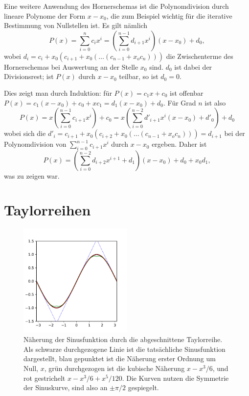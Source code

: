 Eine weitere Anwendung des Hornerschemas ist die Polynomdivision durch
lineare Polynome der Form $x-x_0$, die zum Beispiel wichtig für die
iterative Bestimmung von Nullstellen ist. Es gilt nämlich
\begin{equation}
  \label{eq:polynomdiv}
  P(x) = \sum_{i=0}^{n} c_ix^{i} = 
  \left(\sum_{i=0}^{n-1} d_{i+1}x^{i}\right)(x-x_0) + d_0,
\end{equation}
wobei $d_i = c_i + x_0(c_{i+1} + x_0(\ldots (c_{n-1} + x_o c_n)))$ die
Zwischenterme des Hornerschemas bei Auswertung an der Stelle $x_0$
sind. $d_0$ ist dabei der Divisionsrest; ist $P(x)$ durch $x-x_0$
teilbar, so ist $d_0=0$. 

Dies zeigt man durch Induktion: für $P(x) = c_1 x + c_0$ ist offenbar
$P(x) = c_1(x-x_0) + c_0 + x c_1 = d_1(x-x_0) + d_0$. Für Grad $n$ ist
also
\begin{equation}
    P(x) = x \left(\sum_{i=0}^{n-1} c_{i+1}x^{i}\right) + c_0
    = x\left(\sum_{i=0}^{n-2} d'_{i+1}x^{i}(x-x_0) + d'_0\right) +
    d_0
\end{equation}
wobei sich die $d'_i = c_{i+1} + x_0(c_{i+2} + x_0(\ldots (c_{n-1} +
x_o c_n))) = d_{i+1}$ bei der Polynomdivision von $\sum_{i=0}^{n-1}
c_{i+1}x^{i}$ durch $x-x_0$ ergeben. Daher ist
\begin{equation}
    P(x) = \left(\sum_{i=0}^{n-2} d_{i+2}x^{i+1} + d_1\right)(x-x_0) +
    d_0 + x_0 d_1,
\end{equation}
was zu zeigen war.

\section{Taylorreihen}

\begin{figure}
  \centering
  \includegraphics[width=0.5\textwidth]{plots/sinus}
  \caption{Näherung der Sinusfunktion durch die abgeschnittene
    Taylorreihe. Als schwarze durchgezogene Linie ist die tatsächliche
    Sinusfunktion dargestellt, blau gepunktet ist die Näherung erster
    Ordnung um Null, $x$, grün durchgezogen ist die kubische Näherung
    $x - x^3/6$, und rot gestrichelt $x-x^3/6 + x^5/120$. Die Kurven
    nutzen die Symmetrie der Sinuskurve, sind also an $\pm\pi/2$
    gespiegelt.}
  \label{fig:sinus}
\end{figure}


